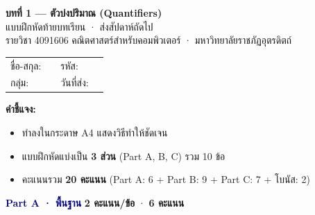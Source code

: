 \documentclass[a4paper,14pt]{article}
\begin{document}
\begin{tcolorbox}[colback=navy,colframe=navy,coltext=white,
  arc=4mm,boxrule=0pt,left=10pt,right=10pt,top=8pt,bottom=8pt]
\begin{center}
{\Large\bfseries บทที่ 1 — ตัวบ่งปริมาณ (Quantifiers)}\\[2pt]
{\large แบบฝึกหัดท้ายบทเรียน · ส่งสัปดาห์ถัดไป}\\[2pt]
{\normalsize รายวิชา 4091606 คณิตศาสตร์สำหรับคอมพิวเตอร์ · มหาวิทยาลัยราชภัฏอุตรดิตถ์}
\end{center}
\end{tcolorbox}

\vspace{0.4em}

\noindent
\begin{tabularx}{\textwidth}{@{}l X l X@{}}
ชื่อ-สกุล: & \dotfill & รหัส: & \dotfill \\
กลุ่ม: & \dotfill & วันที่ส่ง: & \dotfill \\
\end{tabularx}

\vspace{0.3em}

\begin{tcolorbox}[colback=cream,colframe=gold,arc=3mm,boxrule=0.5pt,
  left=10pt,right=10pt,top=6pt,bottom=6pt]
\textbf{คำชี้แจง:}
\begin{itemize}[leftmargin=*,topsep=2pt,itemsep=1pt]
  \item ทำลงในกระดาษ A4 แสดงวิธีทำให้ชัดเจน
  \item แบบฝึกหัดแบ่งเป็น \textbf{3 ส่วน} (Part A, B, C) รวม 10 ข้อ
  \item คะแนนรวม \textbf{20 คะแนน} (Part A: 6 + Part B: 9 + Part C: 7 + โบนัส: 2)
\end{itemize}
\end{tcolorbox}

\vspace{0.5em}

\begin{tcolorbox}[colback=lightnavy,colframe=navy,arc=3mm,boxrule=0.5pt,
  left=10pt,right=10pt,top=6pt,bottom=6pt]
\textbf{\textcolor{navy}{Part A · พื้นฐาน}} \hfill \textbf{2 คะแนน/ข้อ} · \textbf{6 คะแนน}
\end{tcolorbox}
\end{document}
